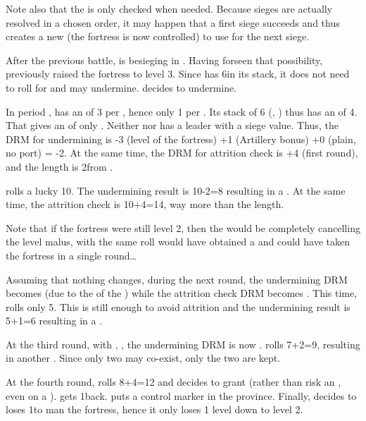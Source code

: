 Note also that the \SoS is only checked when needed. Because sieges are
actually resolved in a chosen order, it may happen that a first siege succeeds
and thus creates a new \SoS (the fortress is now controlled) to use for the
next siege.

\begin{exemple}[Undermining]
  After the previous battle, \FRA is besieging \villeArras in
  \provinceArtois. Having forseen that possibility, \HIS previously raised the
  fortress to level 3. Since \FRA has 6\LD in its stack, it does not need to
  roll for  and may undermine. \FRA decides to
  undermine.

  In period , \FRA has an  of 3 per
  \ARMY\faceplus, hence only 1 per \ARMY\facemoins. Its stack of 6\LD
  (\ARMY\faceplus, \ARMY\facemoins) thus has an  of
  4. That gives an  of only . Neither \FRA
  nor \HIS has a leader with a siege value. Thus, the DRM for undermining is
  -3 (level of the fortress) +1 (Artillery bonus) +0 (plain, no port) = -2. At
  the same time, the DRM for attrition check is +4 (first round), and the \LoS
  length is 2\MP from \villeParis.

  \FRA rolls a lucky 10. The undermining result is 10-2=8 resulting in a
  \USURE\faceplus. At the same time, the attrition check is 10+4=14, way more
  than the \LoS length.

  Note that if the fortress were still level 2, then the  would be  completely cancelling the level malus, with the
  same roll \FRA would have obtained a  and could have taken the
  fortress in a single round\ldots

  \smallskip

  Assuming that nothing changes, during the next round, the undermining DRM
  becomes  (due to the  of the \USURE\faceplus) while the
  attrition check DRM becomes . This time, \FRA rolls only 5. This is
  still enough to avoid attrition and the undermining result is 5+1=6
  resulting in a \USURE\facemoins.

  At the third round, with \USURE\faceplus, \USURE\facemoins, the undermining
  DRM is now . \FRA rolls 7+2=9, resulting in another
  \USURE\faceplus. Since only two \USURE may co-exist, only the two \Faceplus
  are kept.

  At the fourth round, \FRA rolls 8+4=12 and decides to grant \HIS {} (rather than risk an , even on a
  ). \HIS gets 1\LD back. \FRA puts a control marker in the
  province. Finally, \FRA decides to loses 1\LD to man the fortress, hence it
  only loses 1 level down to level 2.
\end{exemple}

